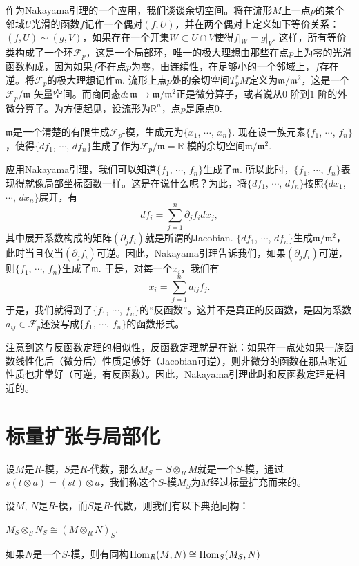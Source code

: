 \para 作为Nakayama引理的一个应用，我们谈谈余切空间。将在流形$M$上一点$p$的某个邻域$U$光滑的函数$f$记作一个偶对$(f,U)$，并在两个偶对上定义如下等价关系：$(f,U)\sim (g,V)$，如果存在一个开集$W\subset U\cap V$使得$f|_W=g|_V$. 这样，所有等价类构成了一个环$\mathcal{F}_p$，这是一个局部环，唯一的极大理想由那些在点$p$上为零的光滑函数构成，因为如果$f$不在点$p$为零，由连续性，在足够小的一个邻域上，$f$存在逆。将$\mathcal{F}_p$的极大理想记作$\mathfrak{m}$. 流形上点$p$处的余切空间$T_p^*M$定义为$\mathfrak{m}/\mathfrak{m}^2$，这是一个$\mathcal{F}_p/\mathfrak{m}$-矢量空间。而商同态$d:\mathfrak{m}\to \mathfrak{m}/\mathfrak{m}^2$正是微分算子，或者说从$0$-阶到$1$-阶的外微分算子。为方便起见，设流形为$\mathbb{R}^n$，点$p$是原点$0$.

$\mathfrak{m}$是一个清楚的有限生成$\mathcal{F}_p$-模，生成元为$\{x_1$, $\cdots$, $x_n\}$. 现在设一族元素$\{f_1$, $\cdots$, $f_n\}$，使得$\{df_1$, $\cdots$, $df_n\}$生成了作为$\mathcal{F}_p/\mathfrak{m}=\mathbb{R}$-模的余切空间$\mathfrak{m}/\mathfrak{m}^2$.

应用Nakayama引理，我们可以知道$\{f_1$, $\cdots$, $f_n\}$生成了$\mathfrak{m}$. 所以此时，$\{f_1$, $\cdots$, $f_n\}$表现得就像局部坐标函数一样。这是在说什么呢？为此，将$\{df_1$, $\cdots$, $df_n\}$按照$\{dx_1$, $\cdots$, $dx_n\}$展开，有
\[
	df_i=\sum_{j=1}^n\partial_jf_i dx_j,
\]
其中展开系数构成的矩阵$(\partial_jf_i)$就是所谓的Jacobian. $\{df_1$, $\cdots$, $df_n\}$生成$\mathfrak{m}/\mathfrak{m}^2$，此时当且仅当$(\partial_jf_i)$可逆。因此，Nakayama引理告诉我们，如果$(\partial_jf_i)$可逆，则$\{f_1$, $\cdots$, $f_n\}$生成了$\mathfrak{m}$. 于是，对每一个$x_i$，我们有
\[
	x_i=\sum_{j=1}^n a_{ij}f_j.
\]
于是，我们就得到了$\{f_1$, $\cdots$, $f_n\}$的“反函数”。这并不是真正的反函数，是因为系数$a_{ij}\in \mathcal{F}_p$还没写成$\{f_1$, $\cdots$, $f_n\}$的函数形式。

注意到这与反函数定理的相似性，反函数定理就是在说：如果在一点处如果一族函数线性化后（微分后）性质足够好（Jacobian可逆），则非微分的函数在那点附近性质也非常好（可逆，有反函数）。因此，Nakayama引理此时和反函数定理是相近的。

\section{标量扩张与局部化}

\para 设$M$是$R$-模，$S$是$R$-代数，那么$M_S=S\otimes_R M$就是一个$S$-模，通过$s(t\otimes a)=(st)\otimes a$，我们称这个$S$-模$M_S$为$M$经过标量扩充而来的。

\begin{lem}
设$M$, $N$是$R$-模，而$S$是$R$-代数，则我们有以下典范同构：
\begin{compactenum}[~~~(1)]
\item $M_S\otimes_S N_S\cong (M\otimes_R N)_S$.
\item 如果$N$是一个$S$-模，则有同构$\operatorname{Hom}_R(M,N)\cong \operatorname{Hom}_S(M_S,N)$
\end{compactenum}
\end{lem}

